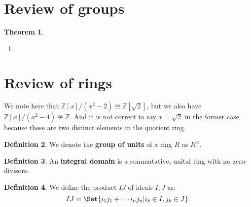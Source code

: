 \documentclass[9pt,reqno,twoside]{amsbook}
\theoremstyle{plain}
\newtheorem{theorem}{Theorem}[chapter]
\numberwithin{section}{chapter}
\numberwithin{equation}{chapter}
\theoremstyle{definition}
\newtheorem{Def}[theorem]{Definition}
\theoremstyle{remark}
\theoremstyle{plain}
\begin{document}


\setcounter{page}{4}

\tableofcontents

\section{Review of groups}

\begin{theorem}

\begin{enumerate}
\item
\end{enumerate}
\end{theorem}



\section{Review of rings}

We note here that $\mathbb{Z}[x]/(x^2 - 2) \cong \mathbb{Z}[\sqrt{2}]$, but we also have $\mathbb{Z}[x]/(x^2 - 4) \ncong \mathbb{Z}$. And it is not correct to say $x = \sqrt{2}$ in the former case because these are two distinct elements in the quotient ring. 

\begin{Def}
We denote the \textbf{group of units} of a ring $R$ as $R^\times$. 
\end{Def}


\begin{Def}
An \textbf{integral domain} is a commutative, unital ring with no zero-divisors. 
\end{Def}

\begin{Def}
We define the product $IJ$ of ideals $I,J$ as:
$$
IJ = \Set{i_1j_1 + \cdots i_nj_n|i_k \in I,j_k \in J}.
$$
\end{Def}
\end{document}
